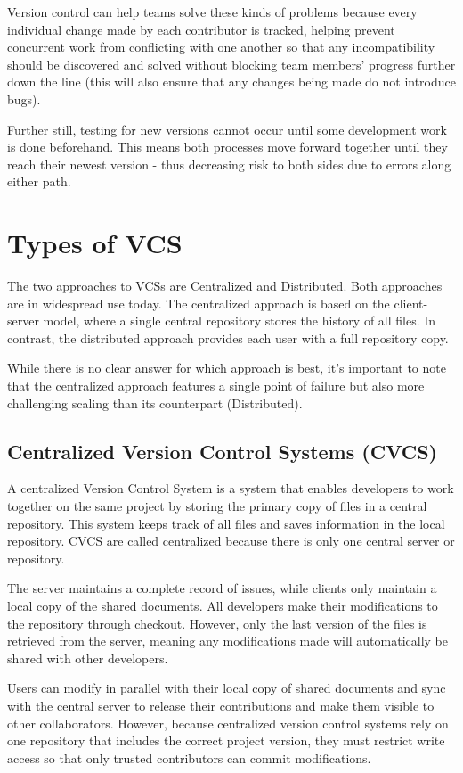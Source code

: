 Version control can help teams solve these kinds of problems because every individual change made by each contributor is tracked, helping prevent concurrent work from conflicting with one another so that any incompatibility should be discovered and solved without blocking team members' progress further down the line (this will also ensure that any changes being made do not introduce bugs).

Further still, testing for new versions cannot occur until some development work is done beforehand. This means both processes move forward together until they reach their newest version - thus decreasing risk to both sides due to errors along either path.
\section{Types of VCS}
The two approaches to VCSs are Centralized and Distributed. Both approaches are in widespread use today. The centralized approach is based on the client-server model, where a single central repository stores the history of all files. In contrast, the distributed approach provides each user with a full repository copy.

While there is no clear answer for which approach is best, it's important to note that the centralized approach features a single point of failure but also more challenging scaling than its counterpart (Distributed).
\subsection{Centralized Version Control Systems (CVCS)}
A centralized Version Control System is a system that enables developers to work together on the same project by storing the primary copy of files in a central repository. This system keeps track of all files and saves information in the local repository. CVCS are called centralized because there is only one central server or repository.

The server maintains a complete record of issues, while clients only maintain a local copy of the shared documents. All developers make their modifications to the repository through checkout. However, only the last version of the files is retrieved from the server, meaning any modifications made will automatically be shared with other developers.

Users can modify in parallel with their local copy of shared documents and sync with the central server to release their contributions and make them visible to other collaborators. However, because centralized version control systems rely on one repository that includes the correct project version, they must restrict write access so that only trusted contributors can commit modifications.

